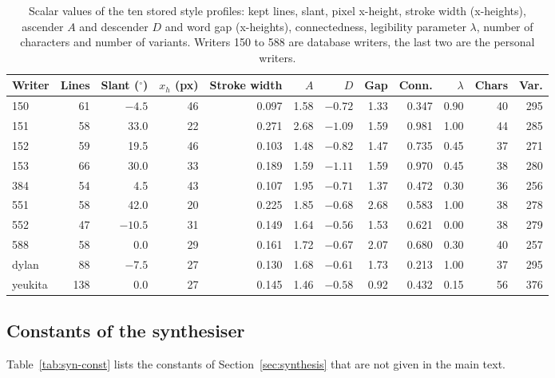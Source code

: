 \begin{table}[h]
\centering
\fontsize{9}{11}\selectfont
\setlength{\tabcolsep}{3pt}
\begin{tabular}{|l|r|r|r|r|r|r|r|r|r|r|r|}
\hline
\textbf{Writer} & \textbf{Lines} & \textbf{Slant ($^\circ$)} & \textbf{$x_h$ (px)} & \textbf{Stroke width} & \textbf{$A$} & \textbf{$D$} & \textbf{Gap} & \textbf{Conn.} & \textbf{$\lambda$} & \textbf{Chars} & \textbf{Var.} \\
\hline
150 & 61 & $-4.5$ & 46 & 0.097 & 1.58 & $-0.72$ & 1.33 & 0.347 & 0.90 & 40 & 295 \\
151 & 58 & 33.0 & 22 & 0.271 & 2.68 & $-1.09$ & 1.59 & 0.981 & 1.00 & 44 & 285 \\
152 & 59 & 19.5 & 46 & 0.103 & 1.48 & $-0.82$ & 1.47 & 0.735 & 0.45 & 37 & 271 \\
153 & 66 & 30.0 & 33 & 0.189 & 1.59 & $-1.11$ & 1.59 & 0.970 & 0.45 & 38 & 280 \\
384 & 54 & 4.5 & 43 & 0.107 & 1.95 & $-0.71$ & 1.37 & 0.472 & 0.30 & 36 & 256 \\
551 & 58 & 42.0 & 20 & 0.225 & 1.85 & $-0.68$ & 2.68 & 0.583 & 1.00 & 38 & 278 \\
552 & 47 & $-10.5$ & 31 & 0.149 & 1.64 & $-0.56$ & 1.53 & 0.621 & 0.00 & 38 & 279 \\
588 & 58 & 0.0 & 29 & 0.161 & 1.72 & $-0.67$ & 2.07 & 0.680 & 0.30 & 40 & 257 \\
dylan & 88 & $-7.5$ & 27 & 0.130 & 1.68 & $-0.61$ & 1.73 & 0.213 & 1.00 & 37 & 295 \\
yeukita & 138 & 0.0 & 27 & 0.145 & 1.46 & $-0.58$ & 0.92 & 0.432 & 0.15 & 56 & 376 \\
\hline
\end{tabular}
\caption{Scalar values of the ten stored style profiles: kept lines, slant, pixel x-height, stroke width (x-heights), ascender $A$ and descender $D$ and word gap (x-heights), connectedness, legibility parameter $\lambda$, number of characters and number of variants. Writers 150 to 588 are database writers, the last two are the personal writers.}
\label{tab:sty-writers}
\end{table}

\subsection{Constants of the synthesiser}

Table~\ref{tab:syn-const} lists the constants of Section~\ref{sec:synthesis} that are not given in the main text.

